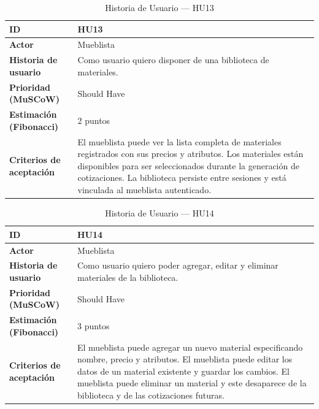 ﻿\documentclass{iccmemoria}
\begin{document}
\begin{table}[H]
\centering
\caption{Historia de Usuario — HU13}
\begin{tabular}{|p{4.5cm}|p{9.5cm}|}
\hline
\textbf{ID} & HU13 \\
\hline
\textbf{Actor} & Mueblista \\
\hline
\textbf{Historia de usuario} & Como usuario quiero disponer de una biblioteca de materiales. \\
\hline
\textbf{Prioridad (MuSCoW)} & Should Have \\
\hline
\textbf{Estimación (Fibonacci)} & 2 puntos \\
\hline
\textbf{Criterios de aceptación} & El mueblista puede ver la lista completa de materiales registrados con sus precios y atributos.\newline
Los materiales están disponibles para ser seleccionados durante la generación de cotizaciones.\newline
La biblioteca persiste entre sesiones y está vinculada al mueblista autenticado. \\
\hline
\end{tabular}
\end{table}

\begin{table}[H]
\centering
\caption{Historia de Usuario — HU14}
\begin{tabular}{|p{4.5cm}|p{9.5cm}|}
\hline
\textbf{ID} & HU14 \\
\hline
\textbf{Actor} & Mueblista \\
\hline
\textbf{Historia de usuario} & Como usuario quiero poder agregar, editar y eliminar materiales de la biblioteca. \\
\hline
\textbf{Prioridad (MuSCoW)} & Should Have \\
\hline
\textbf{Estimación (Fibonacci)} & 3 puntos \\
\hline
\textbf{Criterios de aceptación} & El mueblista puede agregar un nuevo material especificando nombre, precio y atributos.\newline
El mueblista puede editar los datos de un material existente y guardar los cambios.\newline
El mueblista puede eliminar un material y este desaparece de la biblioteca y de las cotizaciones futuras. \\
\hline
\end{tabular}
\end{table}
\end{document}
